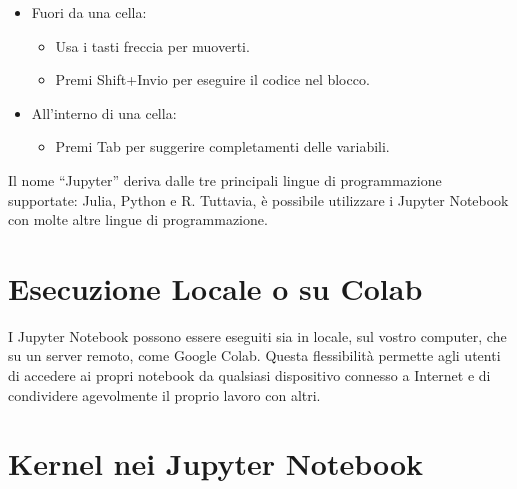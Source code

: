 \documentclass[
  letterpaper,
  krantz2]{{[}./krantz{]}}
\providecommand{\tightlist}{%
  \setlength{\itemsep}{0pt}\setlength{\parskip}{0pt}}\usepackage{longtable,booktabs,array}
\begin{document}
\begin{itemize}
\tightlist
\item
  Fuori da una cella:

  \begin{itemize}
  \tightlist
  \item
    Usa i tasti freccia per muoverti.
  \item
    Premi Shift+Invio per eseguire il codice nel blocco.
  \end{itemize}
\item
  All'interno di una cella:

  \begin{itemize}
  \tightlist
  \item
    Premi Tab per suggerire completamenti delle variabili.
  \end{itemize}
\end{itemize}

\begin{tcolorbox}[enhanced jigsaw, opacityback=0, breakable, left=2mm, opacitybacktitle=0.6, coltitle=black, rightrule=.15mm, colbacktitle=quarto-callout-note-color!10!white, colframe=quarto-callout-note-color-frame, toprule=.15mm, bottomtitle=1mm, toptitle=1mm, leftrule=.75mm, titlerule=0mm, title=\textcolor{quarto-callout-note-color}{\faInfo}\hspace{0.5em}{Nota}, arc=.35mm, bottomrule=.15mm, colback=white]

Il nome ``Jupyter'' deriva dalle tre principali lingue di programmazione
supportate: Julia, Python e R. Tuttavia, è possibile utilizzare i
Jupyter Notebook con molte altre lingue di programmazione.

\end{tcolorbox}

\section{Esecuzione Locale o su
Colab}\label{esecuzione-locale-o-su-colab}

I Jupyter Notebook possono essere eseguiti sia in locale, sul vostro
computer, che su un server remoto, come Google Colab. Questa
flessibilità permette agli utenti di accedere ai propri notebook da
qualsiasi dispositivo connesso a Internet e di condividere agevolmente
il proprio lavoro con altri.

\section{Kernel nei Jupyter Notebook}\label{kernel-nei-jupyter-notebook}
\end{document}
